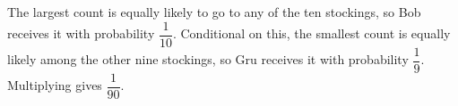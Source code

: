 The largest count is equally likely to go to any of the ten stockings, so Bob receives it with probability $\dfrac{1}{10}$. Conditional on this, the smallest count is equally likely among the other nine stockings, so Gru receives it with probability $\dfrac{1}{9}$. Multiplying gives $\boxed{\dfrac{1}{90}}$.
